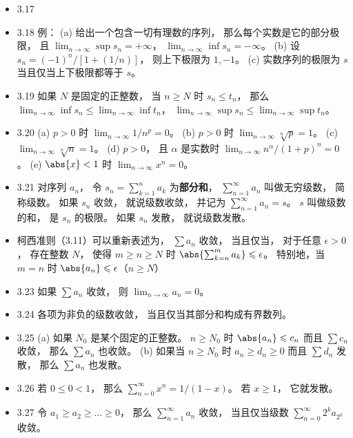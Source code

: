 \begin{itemize}
\item 3.17 

\item 3.18 例： (a) 给出一个包含一切有理数的序列， 那么每个实数是它的部分极限， 且 $\lim_{n\to\infty}\sup s_n = +\infty$， $\lim_{n\to\infty}\inf s_n = -\infty$。 (b) 设 $s_n = (-1)^n/[1+(1/n)]$， 则上下极限为 $1,-1$。 (c) 实数序列的极限为 $s$ 当且仅当上下极限都等于 $s$。

\item 3.19 如果 $N$ 是固定的正整数， 当 $n\geqslant N$ 时 $s_n \leqslant t_n$， 那么 $\lim_{n\to\infty}\inf s_n \leqslant \lim_{n\to\infty}\inf t_n$， $\lim_{n\to\infty}\sup s_n \leqslant \lim_{n\to\infty}\sup t_n$。

\item 3.20 (a) $p > 0$ 时 $\lim_{n\to\infty}1/n^p = 0$。 (b) $p>0$ 时 $\lim_{n\to\infty}{}\sqrt[n]{p} = 1$。 (c) $\lim_{n\to\infty} \sqrt[n]{n} = 1$。 (d) $p>0$， 且 $\alpha$ 是实数时 $\lim_{n\to\infty} n^\alpha/(1+p)^n = 0$。 (e) $\abs{x}<1$ 时 $\lim_{n\to\infty} x^n = 0$。

\item 3.21 对序列 ${a_n}$， 令 $s_n = \sum_{k=1}^n a_k$ 为\textbf{部分和}， $\sum_{n=1}^\infty a_n$ 叫做无穷级数， 简称级数。 如果 $s_n$ 收敛， 就说级数收敛， 并记为 $\sum_{n=1}^\infty a_n = s$。 $s$ 叫做级数的和， 是 $s_n$ 的极限。 如果 $s_n$ 发散， 就说级数发散。

\item 柯西准则（3.11）可以重新表述为， $\sum a_n$ 收敛， 当且仅当， 对于任意 $\epsilon>0$， 存在整数 $N$， 使得 $m \geqslant n \geqslant N$ 时 $\abs{\sum_{k=n}^m a_k} \leqslant \epsilon$。 特别地，当 $m=n$ 时 $\abs{a_n}\leqslant\epsilon$（$n\geqslant N$）

\item 3.23 如果 $\sum a_n$ 收敛， 则 $\lim_{n\to\infty} a_n = 0$。

\item 3.24 各项为非负的级数收敛， 当且仅当其部分和构成有界数列。

\item 3.25 (a) 如果 $N_0$ 是某个固定的正整数。 $n \geqslant N_0$ 时 $\abs{a_n}\leqslant c_n$ 而且 $\sum c_n$ 收敛， 那么 $\sum a_n$ 也收敛。 (b) 如果当 $n\geqslant N_0$ 时 $a_n\geqslant d_n\geqslant 0$ 而且 $\sum d_n$ 发散， 那么 $\sum a_n$ 也发散。

\item 3.26 若 $0\leqslant 0< 1$， 那么 $\sum_{n=0}^\infty x^n = 1/(1-x)$。 若 $x\geqslant 1$， 它就发散。

\item 3.27 令 $a_1\geqslant a_2\geqslant \dots \geqslant 0$， 那么 $\sum_{n=1}^\infty a_n$ 收敛， 当且仅当级数 $\sum_{n=0}^\infty 2^k a_{2^k}$ 收敛。


\end{itemize}
